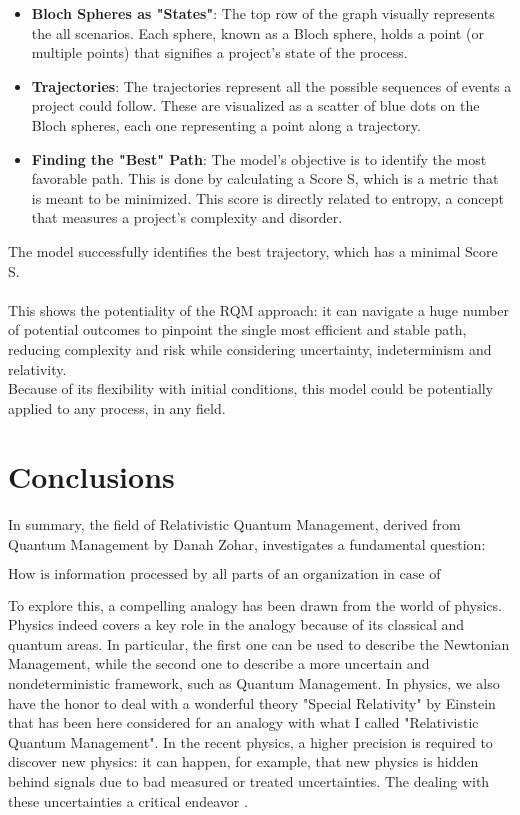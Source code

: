 \documentclass{article}
\begin{document}
\begin{itemize}
\item \textbf{Bloch Spheres as "States"}: The top row of the graph visually represents the all scenarios. Each sphere, known as a Bloch sphere, holds a point (or multiple points) that signifies a project's state of the process.
\item \textbf{Trajectories}: The trajectories represent all the possible sequences of events a project could follow. These are visualized as a scatter of blue dots on the Bloch spheres, each one representing a point along a trajectory.
\item \textbf{Finding the "Best" Path}: The model’s objective is to identify the most favorable path. This is done by calculating a Score S, which is a metric that is meant to be minimized. This score is directly related to entropy, a concept that measures a project's complexity and disorder.
\end{itemize}
The model successfully identifies the best trajectory, which has a minimal Score S.\\\\ This shows the potentiality of the RQM approach: it can navigate a huge number of potential outcomes to pinpoint the single most efficient and stable path, reducing complexity and risk while considering uncertainty, indeterminism and relativity.\\Because of its flexibility with initial conditions, this model could be potentially applied to any process, in any field.
\newpage
\section{Conclusions}
In summary, the field of Relativistic Quantum Management, derived from Quantum Management by Danah Zohar, investigates a fundamental question:
\begin{center}
\begin{equation}
    \text{How is information processed by all parts of an organization in case of uncertainty and indeterminism?}
\end{equation}
\end{center}
To explore this, a compelling analogy has been drawn from the world of physics.\\
Physics indeed covers a key role in the analogy because of its classical and quantum areas. In particular, the first one can be used to describe the Newtonian Management, while the second one to describe a more uncertain and nondeterministic framework, such as Quantum Management.
In physics, we also have the honor to deal with a wonderful theory "Special Relativity" by Einstein that has been here considered for an analogy with what I called "Relativistic Quantum Management".  In the recent physics, a higher precision is required to discover new physics: it can happen, for example, that new physics is hidden behind signals due to bad measured or treated uncertainties. The dealing with these uncertainties a critical endeavor \cite{NNPDF:2021njg}. 
\end{document}
